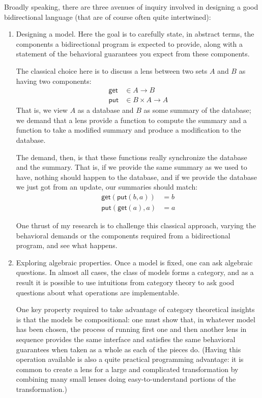 \documentclass{article}
\newcommand{\lget}{\mathsf{get}}
\newcommand{\lput}{\mathsf{put}}
\begin{document}
Broadly speaking, there are three avenues of inquiry involved in designing a
good bidirectional language (that are of course often quite intertwined):
\begin{enumerate}
    \item Designing a model. Here the goal is to carefully state, in
        abstract terms, the components a bidirectional program is expected
        to provide, along with a statement of the behavioral guarantees you
        expect from these components.

        The classical choice here is to discuss a lens between two sets $A$
        and $B$ as having two components:
        \begin{align*}
            \lget &\in A \to B \\
            \lput &\in B \times A \to A
        \end{align*}
        That is, we view $A$ as a database and $B$ as some summary of the
        database; we demand that a lens provide a function to compute the
        summary and a function to take a modified summary and produce a
        modification to the database.

        The demand, then, is that these functions really synchronize the
        database and the summary. That is, if we provide the same summary as
        we used to have, nothing should happen to the database, and if we
        provide the database we just got from an update, our summaries
        should match:
        \begin{align*}
            \lget(\lput(b,a)) &= b \\
            \lput(\lget(a),a) &= a
        \end{align*}

        One thrust of my research is to challenge this classical approach,
        varying the behavioral demands or the components required from a
        bidirectional program, and see what happens.
    \item Exploring algebraic properties. Once a model is fixed, one can
        ask algebraic questions. In almost all cases, the class of models
        forms a category, and as a result it is possible to use intuitions
        from category theory to ask good questions about what operations are
        implementable.

        One key property required to take advantage of category theoretical
        insights is that the models be compositional: one must show that, in
        whatever model has been chosen, the process of running first one and
        then another lens in sequence provides the same interface and
        satisfies the same behavioral guarantees when taken as a whole as
        each of the pieces do.  (Having this operation available is also a
        quite practical programming advantage: it is common to create a lens
        for a large and complicated transformation by combining many small
        lenses doing easy-to-understand portions of the transformation.)


\end{enumerate}
\end{document}
